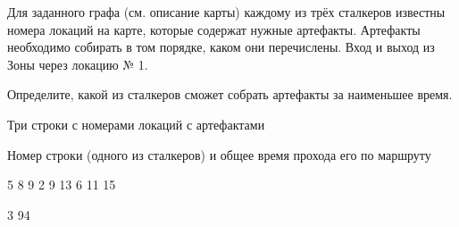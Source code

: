 
Для заданного графа (см. описание карты) каждому из трёх сталкеров известны номера локаций на карте, которые содержат нужные артефакты. Артефакты необходимо собирать в том порядке, каком они перечислены. Вход и выход из Зоны через локацию № 1.

Определите, какой из сталкеров сможет собрать артефакты за наименьшее время.


Три строки с номерами локаций с артефактами

\outputfmtSection

Номер строки (одного из сталкеров) и общее время прохода его по маршруту

\begin{myverbbox}[\small]{\vinput}
    5 8 9
    2 9 13
    6 11 15
\end{myverbbox}
\begin{myverbbox}[\small]{\voutput}
    3 94
\end{myverbbox}

